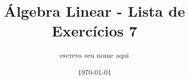 \documentclass[leqno]{article}
\begin{document}
\newtheorem{teo}{Teorema}[section] \newtheorem*{teo*}{Teorema}
\newtheorem{prop}[teo]{Proposição} \newtheorem*{prop*}{Proposição}
\newtheorem{lema}[teo]{Lemma} \newtheorem*{lema*}{Lema}
\newtheorem{cor}[teo]{Corolário} \newtheorem*{cor*}{Corolário}

\theoremstyle{definition}
\newtheorem{defi}[teo]{Definição} \newtheorem*{defi*}{Definição}
\newtheorem{exem}[teo]{Exemplo} \newtheorem*{exem*}{Exemplo}
\newtheorem{obs}[teo]{Observação} \newtheorem*{obs*}{Observação}
\newtheorem*{hipo}{Hipóteses}
\newtheorem*{nota}{Notação}

\newcommand{\ds}{\displaystyle} \newcommand{\nl}{\newline}
\newcommand{\eps}{\varepsilon} \newcommand{\ssty}{\scriptstyle}
\newcommand{\bE}{\mathbb{E}}
\newcommand{\cB}{\mathcal{B}}
\newcommand{\cF}{\mathcal{F}}
\newcommand{\cA}{\mathcal{A}}
\newcommand{\cM}{\mathcal{M}}
\newcommand{\cD}{\mathcal{D}}
\newcommand{\cN}{\mathcal{N}}
\newcommand{\cL}{\mathcal{L}}
\newcommand{\cLN}{\mathcal{LN}}
\newcommand{\bP}{\mathbb{P}}
\newcommand{\bQ}{\mathbb{Q}}
\newcommand{\bN}{\mathbb{N}}
\newcommand{\bR}{\mathbb{R}}
\newcommand{\bZ}{\mathbb{Z}}

\newcommand{\bfw}{\mathbf{w}}
\newcommand{\bfv}{\mathbf{v}}
\newcommand{\bfu}{\mathbf{u}}
\newcommand{\bfx}{\mathbf{x}}
\newcommand{\bfb}{\mathbf{b}}

\newcommand{\bvecc}[2]{%
  \begin{bmatrix} #1 \\ #2  \end{bmatrix}
}
\newcommand{\bveccc}[3]{%
  \begin{bmatrix} #1 \\ #2 \\ #3  \end{bmatrix}
}

\newenvironment{sol} 
{
    \vspace{4mm}
    \noindent\textbf{Resolução:}
    \strut\newline
    \smallskip
    \hspace{-3.5mm} 
} 
{\noindent\rule{4cm}{.1mm}}

\title{Álgebra Linear - Lista de Exercícios 7}

\author{escreva seu nome aqui}

\date{\today}

\maketitle
\end{document}
